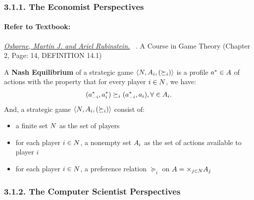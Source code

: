 \documentclass[runningheads]{llncs}
\begin{document}
\subsubsection{3.1.1. The Economist Perspectives}
\paragraph{Refer to Textbook:} 
\href{https://www.sciencedirect.com/science/article/pii/S0899825699907236}{\textit{\underline{Osborne, Martin J. and Ariel Rubinstein.}}}~
\citeyear{osborne1994course}. A Course in Game Theory (Chapter 2, Page: 14, DEFINITION 14.1)

\begin{definition}
A \textbf{Nash Equilibrium} of a strategic game $\langle\mathnormal{N}, \mathnormal{A_{i}},(\succeq_{i})\rangle$ is a profile $a^{*}\in\mathnormal{A}$ of actions with the property that for every player $i\in \mathnormal{N}$, we have:
$$(a^{*}_{-i},a^{*}_{i}) \succeq_{i}(a^{*}_{-i},a_{i}), \forall \in \mathnormal{A_{i}}.$$
And, a strategic game $\langle\mathnormal{N}, \mathnormal{A_{i}},(\succeq_{i})\rangle$  consist of:
\begin{itemize}
    \item a finite set $\mathnormal{N}$ as the set of players
    \item for each player $i\in\mathnormal{N}$, a nonempty set $\mathnormal{A_{i}}$ as the set of actions available to player $i$
    \item for each player $i\in\mathnormal{N}$, a preference relation $\succeq_{i}$ on $\mathnormal{A}=\times_{j\in \mathnormal{N}}\mathnormal{A}_{j}$
\end{itemize}
\end{definition}

\subsubsection{3.1.2. The Computer Scientist Perspectives}
\end{document}
